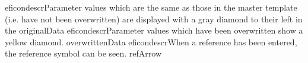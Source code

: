 \begin{gdreficon}
  \jb{}eficondescr{Parameter values which are the same as those in the master 
    template (i.e. 
    have not been overwritten) are displayed with a gray diamond to their left in 
    the \gdpropview{}}{originalData}
  \jb{}eficondescr{Parameter values which have been overwritten show a yellow diamond. }{overwrittenData}
  \jb{}eficondescr{When a reference has been entered, the reference symbol can be seen. }{refArrow}
\end{gdreficon}
